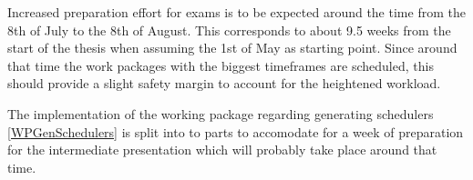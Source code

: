 \documentclass[paper=a4,nochapname,accentcolor=tud9c]{tudexercise}
\begin{document}
\medskip

Increased preparation effort for exams is to be expected around the time from
the 8th of July to the 8th of August. This corresponds to about 9.5 weeks from the
start of the thesis when assuming the 1st of May as starting point.
Since around that time the work packages with the biggest timeframes are
scheduled, this should provide a slight safety margin to account for the
heightened workload.

The implementation of the working package regarding generating schedulers
\ref{WPGenSchedulers} is split into to parts to accomodate for a week of
preparation for the intermediate presentation which will probably take place
around that time.

\printbibliography[heading=bibnumbered]
\end{document}

